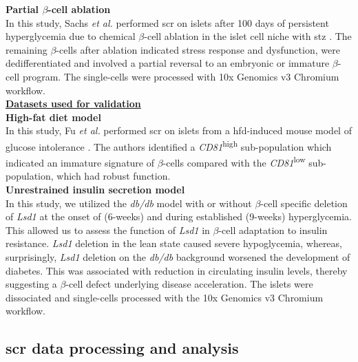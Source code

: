 \textbf{Partial $\beta$-cell ablation\\}
In this study, Sachs \textit{et al.} performed \gls{scr} on islets after 100 days of persistent hyperglycemia due to chemical $\beta$-cell ablation in the islet cell niche with \gls{stz} \textbf{\cite{sachs_targeted_2020}}. The remaining $\beta$-cells after ablation indicated  stress response and dysfunction, were dedifferentiated and involved a partial reversal to an embryonic or immature $\beta$-cell program. The single-cells were processed with 10x Genomics v3 Chromium workflow.\\

\underline{\normalsize \textbf{Datasets used for validation}}\\
\label{subsubsec:met_chp3_data}
\textbf{High-fat diet model\\}
In this study, Fu \textit{et al.} performed \gls{scr} on islets from a \gls{hfd}-induced mouse model of glucose intolerance \textbf{\cite{fu_single-cell_2023}}. The authors identified a \textit{CD81}\textsuperscript{high} sub-population which indicated an immature signature of $\beta$-cells compared with the \textit{CD81}\textsuperscript{low} sub-population, which had robust function.\\

\textbf{Unrestrained insulin secretion model\\}
In this study, we utilized the \textit{db/db} model with or without $\beta$-cell specific deletion of \textit{Lsd1} at the onset of (6-weeks) and during established (9-weeks) hyperglycemia. This allowed us to assess the function of \textit{Lsd1} in $\beta$-cell adaptation to insulin resistance. \textit{Lsd1} deletion in the lean state caused severe hypoglycemia, whereas, surprisingly, \textit{Lsd1} deletion on the \textit{db/db} background worsened the development of diabetes. This was associated with reduction in circulating insulin levels, thereby suggesting a $\beta$-cell defect underlying disease acceleration. The islets were dissociated and single-cells processed with the 10x Genomics v3 Chromium workflow.\\ 


\subsection[\glsentryshort{scr} data processing and analysis]{\gls{scr} data processing and analysis}

